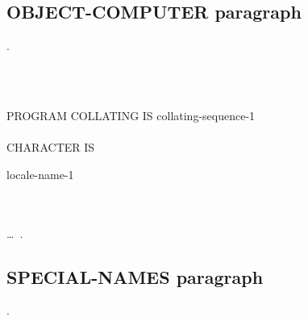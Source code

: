 \subsection{OBJECT-COMPUTER paragraph}
.

\begin{0-1}
  \begin{0-1}
    \begin{1=}
      \computername
    \end{1=}\gnucobol{\ldots}
  \end{0-1}\\\quad
  \begin{0-1}
     \\
    PROGRAM COLLATING  IS collating-sequence-1 \\
     \\
    CHARACTER  IS
    \begin{1=}
      locale-name-1 \\
       \\
       \\
    \end{1=}
  \end{0-1}\ldots\ {}.
\end{0-1}

\subsection{SPECIAL-NAMES paragraph}

\begin{0-1}
  .
\end{0-1}

